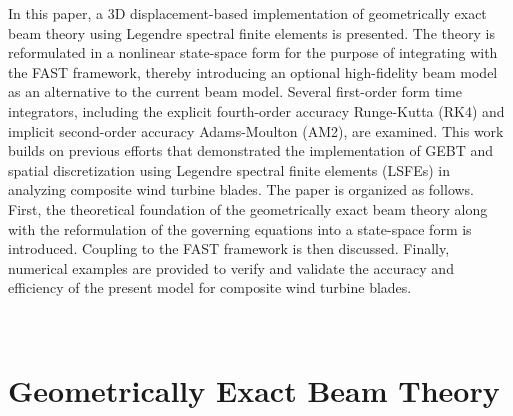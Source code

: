 \documentclass{aiaa-tc}
\begin{document}
In this paper, a 3D displacement-based
implementation of geometrically exact beam theory using Legendre
spectral finite elements is presented. The theory is reformulated in a
nonlinear state-space form for the purpose of integrating with the FAST
framework, thereby introducing an optional high-fidelity beam model as an
alternative to the current beam model. Several first-order form time integrators, including the explicit fourth-order accuracy Runge-Kutta (RK4) and implicit second-order accuracy Adams-Moulton (AM2), are examined. This work builds on previous efforts
that demonstrated the implementation of GEBT and spatial discretization using Legendre spectral finite elements
(LSFEs)\cite{Wang:GEBT2013,Wang:SFE2013,Wang:GEBT2014,Sprague:FAST2014} in analyzing composite wind turbine blades. The paper is organized as
follows.  First, the theoretical foundation of the geometrically exact beam
theory along with the reformulation of the governing equations into a
state-space form is introduced. Coupling to the FAST framework is then
discussed. Finally, numerical examples are
provided to verify and validate the accuracy and efficiency of the present model for
composite wind turbine blades. 

~

\section{Geometrically Exact Beam Theory}
\end{document}
